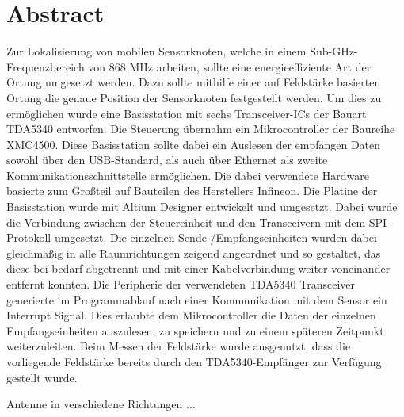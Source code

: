 \newpage
\chapter*{Abstract}
\label{sec:abstract}
\pagestyle{scrheadings}

Zur Lokalisierung von mobilen Sensorknoten, welche in einem Sub-GHz-Frequenzbereich von 868 MHz arbeiten, sollte eine energieeffiziente Art der Ortung umgesetzt werden. Dazu sollte mithilfe einer auf Feldstärke basierten Ortung die genaue Position der Sensorknoten festgestellt werden. Um dies zu ermöglichen wurde eine Basisstation mit sechs Transceiver-ICs der Bauart TDA5340 entworfen. Die Steuerung übernahm ein Mikrocontroller der Baureihe XMC4500. Diese Basisstation sollte dabei ein Auslesen der empfangen Daten  sowohl über den USB-Standard, als auch über Ethernet als zweite Kommunikationsschnittstelle ermöglichen. Die dabei verwendete Hardware basierte zum Großteil auf Bauteilen des Herstellers Infineon. 
Die Platine der Basisstation wurde mit Altium Designer entwickelt und umgesetzt. Dabei wurde die  Verbindung zwischen der Steuereinheit und den Transceivern mit dem SPI-Protokoll umgesetzt. Die einzelnen Sende-/Empfangseinheiten wurden dabei gleichmäßig in alle Raumrichtungen zeigend angeordnet und so gestaltet, das diese bei bedarf abgetrennt und mit einer Kabelverbindung weiter voneinander entfernt konnten.
Die Peripherie der verwendeten TDA5340 Transceiver generierte im Programmablauf nach einer Kommunikation mit dem Sensor ein Interrupt Signal. Dies erlaubte dem Mikrocontroller die Daten der einzelnen Empfangseinheiten auszulesen, zu speichern und zu einem späteren Zeitpunkt weiterzuleiten. Beim Messen der Feldstärke wurde ausgenutzt, dass die vorliegende Feldstärke bereits durch den TDA5340-Empfänger zur Verfügung gestellt wurde.


Antenne in verschiedene Richtungen ...